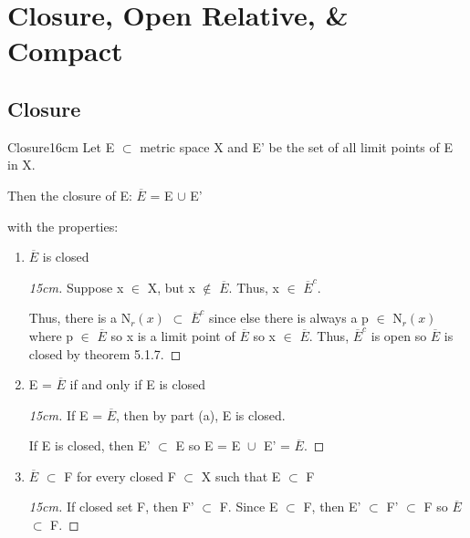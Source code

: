 \newpage
\section[Day 6: Open Relative and Compactness]{ Closure, Open Relative, \& Compact }

\subsection{ Closure }

	\begin{definition}{Closure}{16cm}
		Let E $\subset$ metric space X and E' be the set of all
        limit points of E in X.

        \qquad Then the closure of E:
            \qquad $\overline{E}$ = E $\cup$ E'

        with the properties:
	\end{definition}

	\begin{enumerate}[label=(\alph*), leftmargin=2cm, itemsep=0.1cm]
        \item $\overline{E}$ is closed
        
			\begin{proof}[15cm]
				Suppose x $\in$ X, but x $\not \in$ $\overline{E}$.
				Thus, x $\in$ $\overline{E}^c$.

				Thus, there is a N$_r(x)$ $\subset$ $\overline{E}^c$
				since else there is always a p $\in$ N$_r(x)$ where
				p $\in$ $\overline{E}$ so x is a limit point of $\overline{E}$
				so x $\in$ $\overline{E}$.
				Thus, $\overline{E}^c$ is open so $\overline{E}$ is closed by
				{\color{red} theorem 5.1.7}.
			\end{proof}

        \item E = $\overline{E}$ if and only if E is closed
        
			\begin{proof}[15cm]
				If E = $\overline{E}$, then by part (a), E is closed.

				If E is closed, then E' $\subset$ E so
				E = E $\cup_{}^{}$ E' = $\overline{E}$.				
			\end{proof}

        \item $\overline{E}$ $\subset$ F for every closed F $\subset$ X
        such that E $\subset$ F

			\begin{proof}[15cm]
				If closed set F, then F' $\subset$ F. Since E $\subset$ F, then
				E' $\subset$ F' $\subset$ F so $\overline{E}$ $\subset$ F.			
			\end{proof}
    \end{enumerate}

